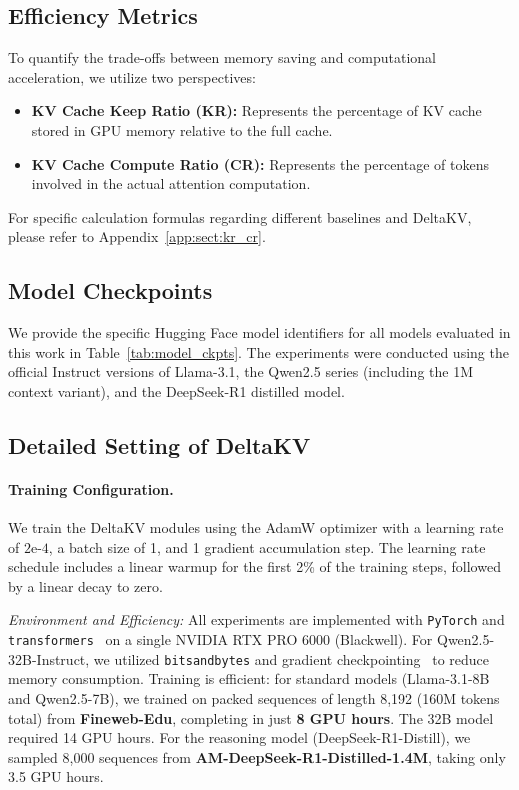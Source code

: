 \subsection{Efficiency Metrics}
\label{app:sect:kr_cr_def}
To quantify the trade-offs between memory saving and computational acceleration, we utilize two perspectives:
\begin{itemize}[nolistsep, left=0pt]
  \item \textbf{KV Cache Keep Ratio (KR):} Represents the percentage of KV cache stored in GPU memory relative to the full cache.
  
  \item \textbf{KV Cache Compute Ratio (CR):} Represents the percentage of tokens involved in the actual attention computation.
\end{itemize}
For specific calculation formulas regarding different baselines and DeltaKV, please refer to Appendix~\ref{app:sect:kr_cr}.

\subsection{Model Checkpoints}

We provide the specific Hugging Face model identifiers for all models evaluated in this work in Table~\ref{tab:model_ckpts}. The experiments were conducted using the official Instruct versions of Llama-3.1, the Qwen2.5 series (including the 1M context variant), and the DeepSeek-R1 distilled model.




\subsection{Detailed Setting of DeltaKV}
\label{subsec:detailed_settings}

\paragraph{Training Configuration.}
We train the DeltaKV modules using the AdamW optimizer with a learning rate of $2\text{e-}4$, a batch size of 1, and 1 gradient accumulation step. The learning rate schedule includes a linear warmup for the first 2\% of the training steps, followed by a linear decay to zero. 

\textit{Environment and Efficiency:} All experiments are implemented with \texttt{PyTorch} and \texttt{transformers}~\cite{wolf2020transformers} on a single NVIDIA RTX PRO 6000 (Blackwell). For Qwen2.5-32B-Instruct, we utilized \texttt{bitsandbytes} and gradient checkpointing~\cite{gradient_ckpt} to reduce memory consumption.
Training is efficient: for standard models (Llama-3.1-8B and Qwen2.5-7B), we trained on packed sequences of length 8,192 (160M tokens total) from \textbf{Fineweb-Edu}, completing in just \textbf{8 GPU hours}. The 32B model required 14 GPU hours. For the reasoning model (DeepSeek-R1-Distill), we sampled 8,000 sequences from \textbf{AM-DeepSeek-R1-Distilled-1.4M}, taking only 3.5 GPU hours.

